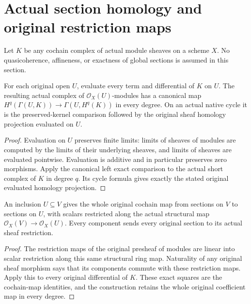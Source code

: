 \section{Actual section homology and original restriction maps}
\label{sec:scheme-section-homology}

Let $K$ be any cochain complex of actual module sheaves on a
scheme $X$. No quasicoherence, affineness, or exactness of
global sections is assumed in this section.

\begin{definition}
\label{def:scheme-original-section-homology}
\leanok
{}
For each original open $U$, evaluate every term and differential
of $K$ on $U$. The resulting actual complex of
$\mathcal O_X(U)$-modules has a canonical map
$H^q(\Gamma(U,K))\to\Gamma(U,H^q(K))$ in every degree.
On an actual native cycle it is the preserved-kernel comparison
followed by the original sheaf homology projection evaluated
on $U$.
\end{definition}
\begin{proof}
Evaluation on $U$ preserves finite limits: limits of sheaves of
modules are computed by the limits of their underlying sheaves,
and limits of sheaves are evaluated pointwise. Evaluation is
additive and in particular preserves zero morphisms. Apply the
canonical left exact comparison to the actual short complex
of $K$ in degree $q$. Its cycle formula gives exactly the
stated original evaluated homology projection.
\end{proof}

\begin{proposition}
\label{prop:scheme-original-section-complex-restriction}
\leanok
{}
An inclusion $U\subseteq V$ gives the whole original cochain
map from sections on $V$ to sections on $U$, with scalars
restricted along the actual structural map
$\mathcal O_X(V)\to\mathcal O_X(U)$. Every component sends
every original section to its actual sheaf restriction.
\end{proposition}
\begin{proof}
The restriction maps of the original presheaf of modules are
linear into scalar restriction along this same structural ring
map. Naturality of any original sheaf morphism says that its
components commute with these restriction maps. Apply this to
every original differential of $K$. These exact squares are
the cochain-map identities, and the construction retains the
whole original coefficient map in every degree.
\end{proof}

